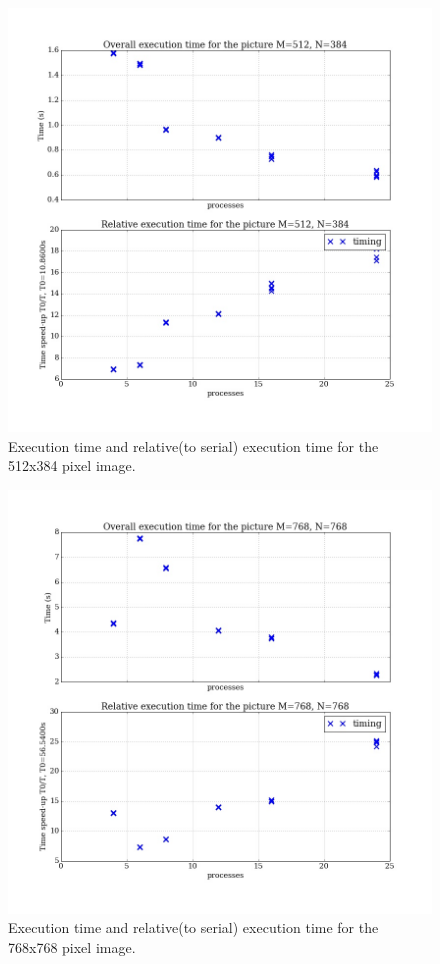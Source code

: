 \documentclass[11pt]{article}
\begin{document}
	\begin{figure}[H]	
		\centering
		\includegraphics[scale=0.4]{exec_512x384.jpeg}
		\caption{Execution time and relative(to serial) execution time for the 512x384 pixel image.}\label{exec_3}
	\end{figure}

	\begin{figure}[H]	
		\centering
		\includegraphics[scale=0.4]{exec_768x768.jpeg}
		\caption{Execution time and relative(to serial) execution time for the 768x768 pixel image.}\label{exec_4}
	\end{figure}
\end{document}

